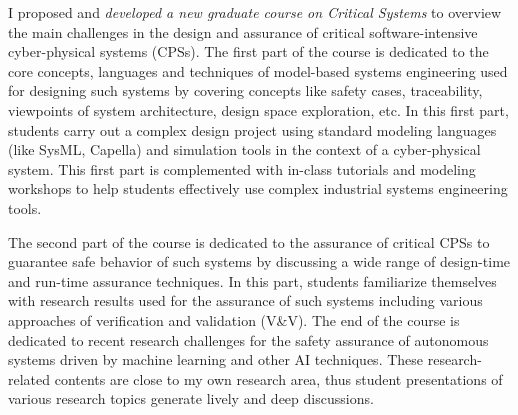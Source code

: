 I proposed and \emph{developed a new graduate course on Critical Systems} to overview the main challenges in the design and assurance of critical software-intensive cyber-physical systems (CPSs). The first part of the course is dedicated to the core concepts, languages and techniques of model-based systems engineering used for designing such systems by covering concepts like safety cases, traceability, viewpoints of system architecture, design space exploration, etc. In this first part, students carry out a complex design project using standard modeling languages (like SysML, Capella) and simulation tools in the context of a cyber-physical system. This first part is complemented with in-class tutorials and modeling workshops to help students effectively use complex industrial systems engineering tools.

The second part of the course is dedicated to the assurance of critical CPSs to guarantee safe behavior of such systems by discussing a wide range of design-time and run-time assurance techniques. In this part, students familiarize themselves with research results used for the assurance of such systems including various approaches of verification and validation (V\&V). The end of the course is dedicated to recent research challenges for the safety assurance of autonomous systems driven by machine learning and other AI techniques. These research-related contents are close to my own research area, thus student presentations of various research topics generate lively and deep discussions. 





